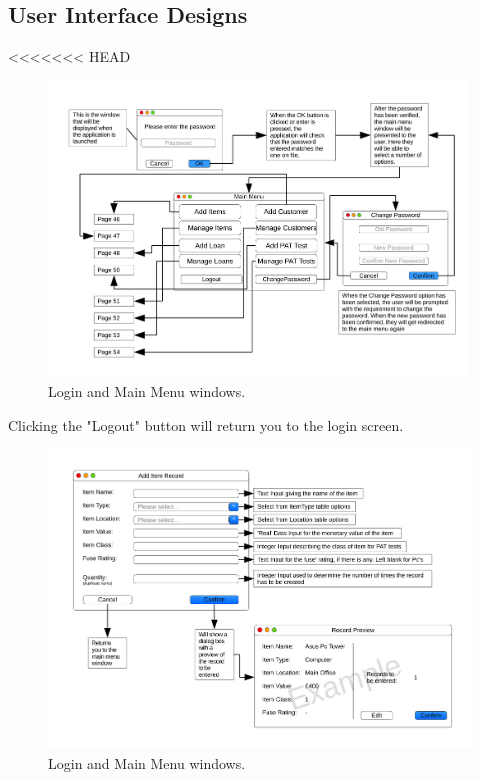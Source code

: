 \begin{landscape}

\section{User Interface Designs}

<<<<<<< HEAD
\begin{figure}[H]
    \begin{center}
        \includegraphics[width=420px]{./Design/user_interface/login_interface.pdf}
    \end{center}
    \caption{Login and Main Menu windows.} \label{fig:print_function_result}
\end{figure}

\begin{center}
    Clicking the "Logout" button will return you to the login screen.
\end{center}

\newpage

\begin{figure}[H]
    \begin{center}
        \includegraphics[width=500px]{./Design/user_interface/Add_item_record_interface.pdf}
    \end{center}
    \caption{Login and Main Menu windows.} \label{fig:print_function_result}
\end{figure}


\end{landscape}
